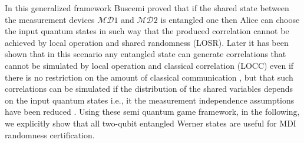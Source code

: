 \documentclass[doublecol,linenumbers]{epl2} %
\begin{document}
In this generalized framework Buscemi proved that if the shared state between the measurement devices $\mathcal{MD}1$ and $\mathcal{MD}2$ is entangled one then Alice can choose the input quantum states in such way that the produced correlation cannot be achieved by local operation and shared randomness (LOSR). Later it has been shown that in this scenario any entangled state can generate correlations that cannot be simulated by local operation and classical correlation (LOCC) even if there is no restriction on the amount of classical communication \cite{Rosset}, but that such correlations can be simulated if the distribution of the shared variables depends on the input quantum states i.e., it the measurement independence assumptions have been reduced \cite{Banik}. Using these semi quantum game framework, in the following, we explicitly show that all two-qubit entangled Werner states are useful for MDI randomness certification. 
\end{document}
